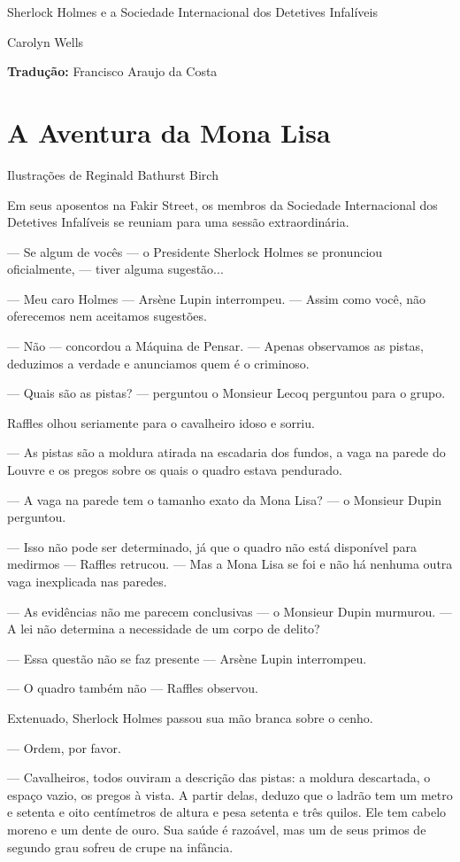 Sherlock Holmes e a Sociedade Internacional dos Detetives Infalíveis

Carolyn Wells

\textbf{Tradução:} Francisco Araujo da Costa

\chapter{A Aventura da Mona Lisa}

Ilustrações de Reginald Bathurst Birch

Em seus aposentos na Fakir Street, os membros da Sociedade Internacional
dos Detetives Infalíveis se reuniam para uma sessão extraordinária.

--- Se algum de vocês --- o Presidente Sherlock Holmes se pronunciou
oficialmente, --- tiver alguma sugestão...

--- Meu caro Holmes --- Arsène Lupin interrompeu. --- Assim como você,
não oferecemos nem aceitamos sugestões.

--- Não --- concordou a Máquina de Pensar. --- Apenas observamos as
pistas, deduzimos a verdade e anunciamos quem é o criminoso.

--- Quais são as pistas? --- perguntou o Monsieur Lecoq perguntou para o
grupo.

Raffles olhou seriamente para o cavalheiro idoso e sorriu.

--- As pistas são a moldura atirada na escadaria dos fundos, a vaga na
parede do Louvre e os pregos sobre os quais o quadro estava pendurado.

--- A vaga na parede tem o tamanho exato da Mona Lisa? --- o Monsieur
Dupin perguntou.

--- Isso não pode ser determinado, já que o quadro não está disponível
para medirmos --- Raffles retrucou. --- Mas a Mona Lisa se foi e não há
nenhuma outra vaga inexplicada nas paredes.

--- As evidências não me parecem conclusivas --- o Monsieur Dupin
murmurou. --- A lei não determina a necessidade de um corpo de delito?

--- Essa questão não se faz presente --- Arsène Lupin interrompeu.

--- O quadro também não --- Raffles observou.

Extenuado, Sherlock Holmes passou sua mão branca sobre o cenho.

--- Ordem, por favor.

--- Cavalheiros, todos ouviram a descrição das pistas: a moldura
descartada, o espaço vazio, os pregos à vista. A partir delas, deduzo
que o ladrão tem um metro e setenta e oito centímetros de altura e pesa
setenta e três quilos. Ele tem cabelo moreno e um dente de ouro. Sua
saúde é razoável, mas um de seus primos de segundo grau sofreu de crupe
na infância.

